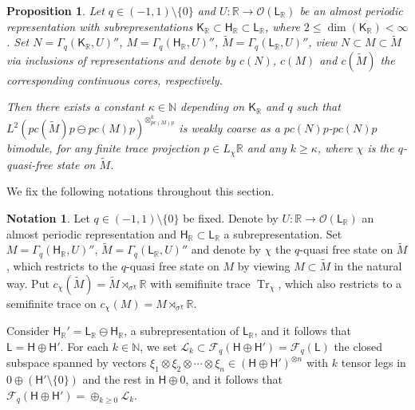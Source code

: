 \documentclass[a4paper,11pt]{amsart}
\newtheorem{prop}[thm]{Proposition}
\theoremstyle{definition}
\newtheorem{note}[thm]{Notation}
\newcommand{\N}{{\mathbb N}}
\newcommand{\R}{{\mathbb R}}
\newcommand{\cF}{{\mathcal F}}
\newcommand{\cL}{{\mathcal L}}
\newcommand{\cO}{{\mathcal O}}
\newcommand{\sH}{\mathsf{H}}
\newcommand{\sK}{\mathsf{K}}
\newcommand{\sL}{\mathsf{L}}
\newcommand{\Tr}{\operatorname{Tr}}
\newcommand{\ot}{\otimes}
\begin{document}
\begin{prop}\label{prop: coarse step lower bound}
Let $q\in (-1,1)\setminus\{0\}$ and 
	$U: \R\to \cO(\sL_\R)$ be an almost periodic representation with subrepresentations $\sK_\R\subset \sH_\R\subset \sL_\R$,
	where $2\leq \dim(\sK_\R)<\infty$.
Set $N=\Gamma_q(\sK_\R, U)''$, 
	$M=\Gamma_q(\sH_\R, U)''$, $\tilde M=\Gamma_q(\sL_\R, U)''$,
	view $N\subset M\subset \tilde M$ via inclusions of representations 
	and denote by $c(N)$, $c(M)$ and $c(\tilde M)$ the corresponding continuous cores, respectively.
	
Then there exists a constant $\kappa\in \N$ depending on $\sK_\R$ and $q$ such that 
$L^2(p c(\tilde M) p \ominus p c(M) p)^{\ot_{pc(M)p}^k}$ is weakly coarse as a $p c(N)p$-$p c(N)p$ bimodule,
	for any finite trace projection $p\in L_\chi\R$
	and any $k\geq \kappa$,
	where $\chi$ is the $q$-quasi-free state on $\tilde M$.
\end{prop}



We fix the following notations throughout this section.
\begin{note}\label{note 1}
Let $q\in (-1,1)\setminus\{0\}$ be fixed.
Denote by $U: \R \to \cO(\sL_\R)$ an almost periodic representation and $\sH_\R\subset \sL_\R$ a subrepresentation.
Set $M=\Gamma_q(\sH_\R, U)''$, $\tilde M=\Gamma_q(\sL_\R, U)''$
	and denote by $\chi$ the $q$-quasi free state on $\tilde M$, which restricts to the $q$-quasi free state on $M$
	by viewing $M\subset \tilde M$ in the natural way.
Put $c_\chi(\tilde M)=\tilde M\rtimes_{\sigma^\chi}\R$ with semifinite trace $\Tr_\chi$,
	which also restricts to a semifinite trace on $c_\chi(M)=M\rtimes_{\sigma^\chi}\R$.

Consider $\sH_\R'=\sL_\R\ominus \sH_\R$, a subrepresentation of $\sL_\R$, and it follows that $\sL=\sH\oplus \sH'$.
For each $k\in \N$, we set $\cL_k\subset \cF_q(\sH\oplus \sH')=\cF_q(\sL)$ the closed subspace spanned by vectors
	$\xi_1\ot\xi_2\ot\cdots \ot\xi_n\in (\sH\oplus \sH')^{\ot n}$ with $k$ tensor legs in $0\oplus (\sH'\setminus\{0\})$ and the rest in $\sH\oplus 0$,
	and it follows that $\cF_q(\sH\oplus \sH')=\oplus_{k\geq 0}\cL_k$.	
\end{note}
\end{document}

